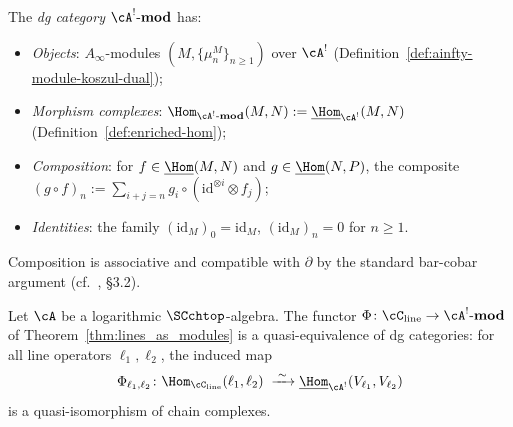 \begin{definition}
The \emph{dg category} $\cA^!\text{-}\mathbf{mod}$
has:
\begin{itemize}
\item \emph{Objects}: $A_\infty$-modules $(M,\{\mu_n^M\}_{n\ge 1})$
 over $\cA^!$ (Definition~\ref{def:ainfty-module-koszul-dual});
\item \emph{Morphism complexes}:
 $\Hom_{\cA^!\text{-}\mathbf{mod}}(M,N)
 :=\underline{\Hom}_{\cA^!}(M,N)$
 (Definition~\ref{def:enriched-hom});
\item \emph{Composition}: for $f\in\underline{\Hom}(M,N)$
 and $g\in\underline{\Hom}(N,P)$, the composite
 $(g\circ f)_n:=
 \sum_{i+j=n}g_i\circ(\mathrm{id}^{\otimes i}\otimes f_j)$;
\item \emph{Identities}: the family $(\mathrm{id}_M)_0=\mathrm{id}_M$,
 $(\mathrm{id}_M)_n=0$ for $n\ge 1$.
\end{itemize}
Composition is associative and compatible with
$\partial$ by the standard bar-cobar argument
(cf.~\cite{LH03}, \S3.2).
\end{definition}

\begin{theorem}
Let\/ $\cA$ be a logarithmic\/ $\SCchtop$-algebra. The functor
$\Phi\colon\cC_{\mathrm{line}}\to\cA^!\text{-}\mathbf{mod}$
of Theorem~\textup{\ref{thm:lines_as_modules}} is a
quasi-equivalence of dg categories: for all line operators
$\ell_1,\ell_2$, the induced map
\begin{equation}
\Phi_{\ell_1,\ell_2}\colon
\Hom_{\cC_{\mathrm{line}}}(\ell_1,\ell_2)
\;\xrightarrow{\;\sim\;}
\underline{\Hom}_{\cA^!}(V_{\ell_1},V_{\ell_2})
\end{equation}
is a quasi-isomorphism of chain complexes.
\end{theorem}

